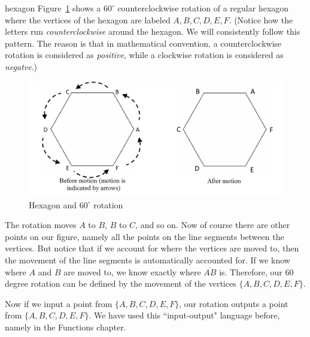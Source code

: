 \begin{example}{hexagon}
Figure~\ref{hex60rot}  shows a $60^\circ$ counterclockwise rotation of a regular hexagon where the vertices of the hexagon are labeled $A,B,C,D,E,F$. (Notice how the letters run \emph{counterclockwise} around the hexagon. We will consistently follow this pattern. The reason is that in mathematical convention, a counterclockwise rotation is considered as \emph{positive}, while a clockwise rotation is considered as \emph{negatve}.)


\begin{figure}[ht]
\begin{center}
\includegraphics[width=5in]{images/hexABCDEF_1.png}
\caption{\label{hex60rot} Hexagon and  $60^\circ$ rotation}
\end{center}
\end{figure}



The rotation moves $A$ to $B$, $B$ to $C$, and so on.  Now of course there are other points on our figure, namely all the points on the line segments between the vertices.  But notice that if we account for where the vertices are moved to, then the movement of the line segments is automatically accounted for.  If we know where $A$ and $B$ are moved to, we know exactly where $\overline{AB}$ is.  Therefore, our $60$ degree rotation can be defined by the movement of the vertices  $\{A,B,C,D,E,F\}$.  

Now if we input a point from $\{A,B,C,D,E,F\}$, our rotation outputs a point from $\{A,B,C,D,E,F\}$.  We have used this ``input-output" language before, namely in the Functions chapter. 


\end{example}
